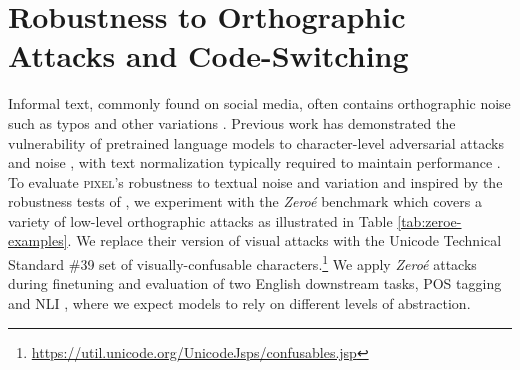 \documentclass{article}
\newcommand{\model}{\textsc{pixel}\xspace}
\begin{document}

\vspace{-2mm}
\section{Robustness to Orthographic Attacks and Code-Switching}
\vspace{-2mm}

Informal text, commonly found on social media, often contains orthographic noise such as typos and other variations \citep{baldwin-etal-2015-shared, EschWritingAcrossWorld, caswell2020language}.
Previous work has demonstrated the vulnerability of pretrained language models to character-level adversarial attacks and noise  \citep{SunADV-BERT, eger-benz-2020-hero}, with text normalization typically required to maintain performance \citep{pruthi-etal-2019-combating, keller-etal-2021-bert}.
To evaluate \model{}'s robustness to textual noise and variation and inspired by the robustness tests of \citet{salesky-etal-2021-robust}, we experiment with the \textit{Zeroé} benchmark \citep{eger-benz-2020-hero,keller-etal-2021-bert} which covers a variety of low-level orthographic attacks as illustrated in Table \ref{tab:zeroe-examples}.
We replace their version of visual attacks with the Unicode Technical Standard \#39 set of visually-confusable characters.\footnote{\url{https://util.unicode.org/UnicodeJsps/confusables.jsp}} 
We apply \textit{Zeroé} attacks during finetuning and evaluation of two English downstream tasks, POS tagging and NLI \citep{bowman-etal-2015-large}, where we expect models to rely on different levels of abstraction. 
\end{document}
